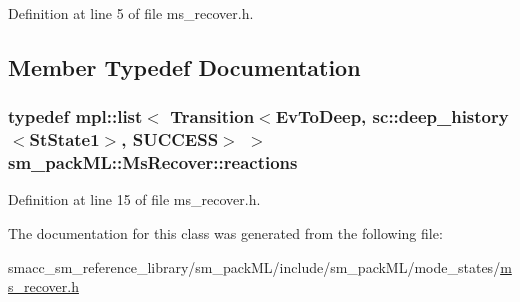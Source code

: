 Definition at line 5 of file ms\+\_\+recover.\+h.



\subsection{Member Typedef Documentation}
\subsubsection[{\texorpdfstring{reactions}{reactions}}]{\setlength{\rightskip}{0pt plus 5cm}typedef mpl\+::list$<$ Transition$<${\bf Ev\+To\+Deep}, sc\+::deep\+\_\+history$<${\bf St\+State1}$>$, {\bf S\+U\+C\+C\+E\+SS}$>$ $>$ {\bf sm\+\_\+pack\+M\+L\+::\+Ms\+Recover\+::reactions}}\hypertarget{classsm__packML_1_1MsRecover_a98651f27644e70929c7d1c976127d2f4}{}\label{classsm__packML_1_1MsRecover_a98651f27644e70929c7d1c976127d2f4}


Definition at line 15 of file ms\+\_\+recover.\+h.



The documentation for this class was generated from the following file\+:\begin{DoxyCompactItemize}
\item 
smacc\+\_\+sm\+\_\+reference\+\_\+library/sm\+\_\+pack\+M\+L/include/sm\+\_\+pack\+M\+L/mode\+\_\+states/\hyperlink{sm__packML_2include_2sm__packML_2mode__states_2ms__recover_8h}{ms\+\_\+recover.\+h}\end{DoxyCompactItemize}
